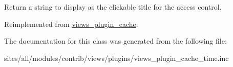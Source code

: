 Return a string to display as the clickable title for the access control. 

Reimplemented from \hyperlink{classviews__plugin__cache_35e5232e39c8148476328e302787d16b}{views\_\-plugin\_\-cache}.

The documentation for this class was generated from the following file:\begin{CompactItemize}
\item 
sites/all/modules/contrib/views/plugins/views\_\-plugin\_\-cache\_\-time.inc\end{CompactItemize}
